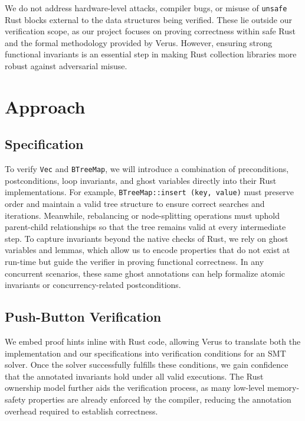 \documentclass[conference]{IEEEtran}
\begin{document}
We do not address hardware-level attacks, compiler bugs, or misuse of \texttt{unsafe} Rust blocks external to the data structures being verified. These lie outside our verification scope, as our project focuses on proving correctness within safe Rust and the formal methodology provided by Verus. However, ensuring strong functional invariants is an essential step in making Rust collection libraries more robust against adversarial misuse.

\section{Approach}

\subsection{Specification}
To verify \texttt{Vec} and \texttt{BTreeMap}, we will introduce a combination of preconditions, postconditions, loop invariants, and ghost variables directly into their Rust implementations. For example, \texttt{BTreeMap::insert (key, value)} must preserve order and maintain a valid tree structure to ensure correct searches and iterations. Meanwhile, rebalancing or node-splitting operations must uphold parent-child relationships so that the tree remains valid at every intermediate step. To capture invariants beyond the native checks of Rust, we rely on ghost variables and lemmas, which allow us to encode properties that do not exist at run-time but guide the verifier in proving functional correctness. In any concurrent scenarios, these same ghost annotations can help formalize atomic invariants or concurrency-related postconditions.

\subsection{Push-Button Verification}
We embed proof hints inline with Rust code, allowing Verus to translate both the implementation and our specifications into verification conditions for an SMT solver. Once the solver successfully fulfills these conditions, we gain confidence that the annotated invariants hold under all valid executions. The Rust ownership model further aids the verification process, as many low-level memory-safety properties are already enforced by the compiler, reducing the annotation overhead required to establish correctness.
\end{document}
